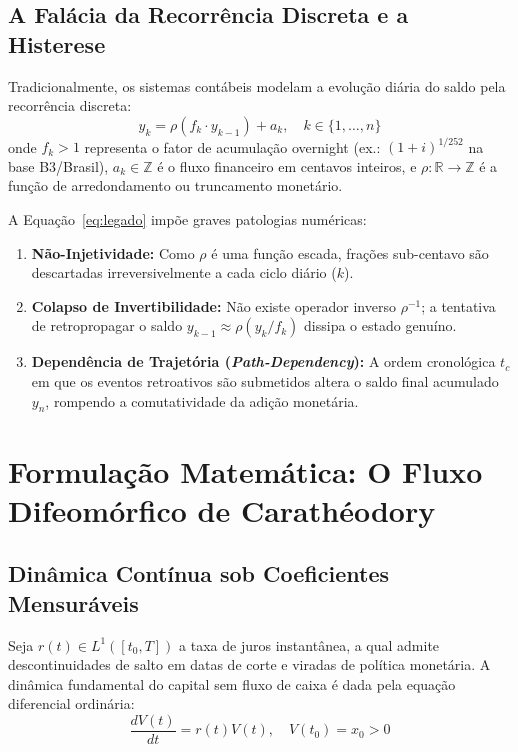\documentclass[11pt,a4paper]{article}
\theoremstyle{definition}
\theoremstyle{remark}
\begin{document}
\subsection{A Falácia da Recorrência Discreta e a Histerese}

Tradicionalmente, os sistemas contábeis modelam a evolução diária do saldo pela recorrência discreta:
\begin{equation}
    y_k = \rho(f_k \cdot y_{k-1}) + a_k, \quad k \in \{1, \dots, n\}
    \label{eq:legado}
\end{equation}
onde $f_k > 1$ representa o fator de acumulação overnight (ex.: $(1 + i)^{1/252}$ na base B3/Brasil), $a_k \in \mathbb{Z}$ é o fluxo financeiro em centavos inteiros, e $\rho : \mathbb{R} \to \mathbb{Z}$ é a função de arredondamento ou truncamento monetário.

A Equação~\eqref{eq:legado} impõe graves patologias numéricas:
\begin{enumerate}
    \item \textbf{Não-Injetividade:} Como $\rho$ é uma função escada, frações sub-centavo são descartadas irreversivelmente a cada ciclo diário ($k$).
    \item \textbf{Colapso de Invertibilidade:} Não existe operador inverso $\rho^{-1}$; a tentativa de retropropagar o saldo $y_{k-1} \approx \rho(y_k / f_k)$ dissipa o estado genuíno.
    \item \textbf{Dependência de Trajetória (\emph{Path-Dependency}):} A ordem cronológica $t_c$ em que os eventos retroativos são submetidos altera o saldo final acumulado $y_n$, rompendo a comutatividade da adição monetária.
\end{enumerate}

\section{Formulação Matemática: O Fluxo Difeomórfico de Carathéodory}

\subsection{Dinâmica Contínua sob Coeficientes Mensuráveis}

Seja $r(t) \in L^1([t_0, T])$ a taxa de juros instantânea, a qual admite descontinuidades de salto em datas de corte e viradas de política monetária. A dinâmica fundamental do capital sem fluxo de caixa é dada pela equação diferencial ordinária:
\begin{equation}
    \frac{dV(t)}{dt} = r(t) V(t), \quad V(t_0) = x_0 > 0
\end{equation}
\end{document}
